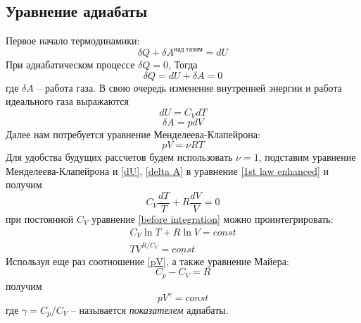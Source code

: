 \documentclass[a4paper,12pt]{report}
\begin{document}
\begin{multicols}{2}
    \subsection*{Уравнение адиабаты}
        Первое начало термодинамики:
        \begin{equation}
            \label{1st law thermodynamics}
            \delta Q + \delta A^{\text{над газом}}=dU
        \end{equation}
        При адиабатическом процессе $\delta Q = 0$, Тогда 
        \begin{equation}
            \label{1st law enhanced}
            \delta Q = dU+\delta A = 0
        \end{equation}
        где $\delta A$ -- работа газа. В свою очередь изменение внутренней энергии и работа идеального газа выражаются
        \begin{equation}
            dU=C_VdT
            \label{dU}
        \end{equation}
        \begin{equation}
            \delta A=pdV
            \label{delta A}
        \end{equation}
        Далее нам потребуется уравнение Менделеева-Клапейрона:
        \begin{equation}
            pV=\nu RT
            \label{pV}
        \end{equation}
        Для удобства будущих рассчетов будем использовать $\nu = 1$, подставим уравнение Менделеева-Клапейрона и \eqref{dU}, \eqref{delta A} в уравнение \eqref{1st law enhanced} и получим
        \begin{equation}
            C_V\frac{dT}{T}+R\frac{dV}{V}=0
            \label{before integration}
        \end{equation}
        при постоянной $C_V$ уравнение \eqref{before integration} можно проинтегрировать:
        \begin{eqnarray}
            C_V\ln T+R\ln V=const\\ 
            TV^{R/C_V}=const
        \end{eqnarray}
        Используя еще раз соотношение \eqref{pV}, а также уравнение Майера:
        \begin{equation}
            \label{Mayer}
            C_p-C_V=R
        \end{equation}
        получим
        \begin{equation}
            \label{final gamma}
            pV^\gamma=const
        \end{equation}
        где $\gamma=C_p/C_V$ -- называется \emph{показателем} адиабаты.


\end{multicols}
\end{document}

